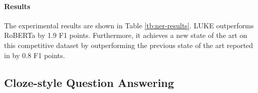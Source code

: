 \documentclass[11pt,a4paper]{article}
\begin{document}
\paragraph{Results}

\begin{table}[t]
    \centering
    \setlength{\tabcolsep}{4pt}
    \caption{Results of named entity recognition on the CoNLL-2003 dataset.}
    \label{tb:ner-results}
\end{table}

The experimental results are shown in Table \ref{tb:ner-results}.
LUKE outperforms RoBERTa by 1.9 F1 points.
Furthermore, it achieves a new state of the art on this competitive dataset by outperforming the previous state of the art reported in  by 0.8 F1 points.

\subsection{Cloze-style Question Answering}
\end{document}

